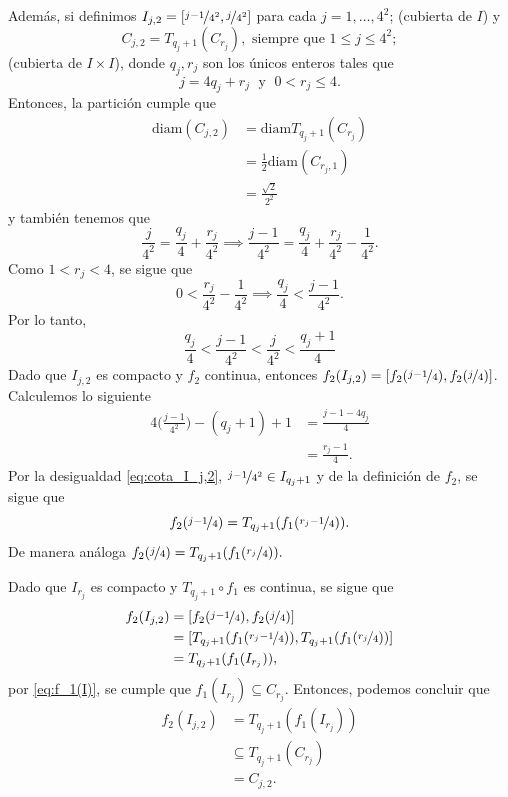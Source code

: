 Además, si definimos $I_{j,2}=[\nicefrac{j-1}{4^2},\nicefrac{j}{4^2}]$ para cada $j=1,\ldots,4^2$; (cubierta de $I$) y
\begin{equation*}
    C_{j,2}=T_{q_j+1}(C_{r_j}), \text{ siempre que } 1\leq j\leq 4^2;
\end{equation*}
(cubierta de $I\times I$), donde $q_j,r_j$ son los únicos enteros tales que
\[
j=4q_j+r_j\; \text{ y } \; 0<r_j\leq 4.
\]
Entonces, la partición cumple que
\begin{align*}
    \text{diam}(C_{j,2})&=\text{diam}T_{q_j+1}(C_{r_j})\\
    &=\frac{1}{2}\text{diam}(C_{r_j,1})\\
    &=\frac{\sqrt{2}}{2^2}
\end{align*}
y también tenemos que
\begin{equation*}
    \frac{j}{4^2}=\frac{q_j}{4}+\frac{r_j}{4^2}
\implies
    \frac{j-1}{4^2}=\frac{q_j}{4}+\frac{r_j}{4^2}-\frac{1}{4^2}.
\end{equation*}
Como $1<r_j<4$, se sigue que 
\begin{equation*}
    0<\frac{r_j}{4^2}-\frac{1}{4^2}\implies \frac{q_j}{4}<\frac{j-1}{4^2}.
\end{equation*}
Por lo tanto,
\begin{equation}
\label{eq:cota_I_j,2}
    \frac{q_j}{4}<\frac{j-1}{4^2}<\frac{j}{4^2}<\frac{q_j+1}{4}
\end{equation}
Dado que $I_{j,2}$ es compacto y $f_2$ continua, entonces $f_2(I_{j,2})=[f_2(\nicefrac{j-1}{4}),f_2(\nicefrac{j}{4})]$. Calculemos lo siguiente
\begin{align*}
    4\Big(\frac{j-1}{4^2}\Big)-(q_j+1)+1&=\frac{j-1-4q_j}{4}\\
    &=\frac{r_j-1}{4}.
\end{align*}
 Por la desigualdad \ref{eq:cota_I_j,2}, $\nicefrac{j-1}{4^2}\in I_{q_j+1}$ y de la definición de $f_2$, se sigue que
\begin{equation*}
    f_2(\nicefrac{j-1}{4})=T_{q_j+1}(f_1(\nicefrac{r_j-1}{4})).
\end{equation*}
De manera análoga $f_2(\nicefrac{j}{4})=T_{q_j+1}(f_1(\nicefrac{r_j\hspace{0.25mm}}{4})).$

Dado que $I_{r_j}$ es compacto y $T_{q_j+1}\circ f_1$ es continua, se sigue que
\begin{align*}
    f_2(I_{j,2})&=
    [f_2(\nicefrac{j-1}{4}),f_2(\nicefrac{j}{4})]\\
    &=[T_{q_j+1}(f_1(\nicefrac{r_j-1}{4})),T_{q_j+1}(f_1(\nicefrac{r_j}{4}))]\\
    &=T_{q_j+1}(f_1(I_{r_j})),
\end{align*}
por \ref{eq:f_1(I)}, se cumple que $f_1(I_{r_j})\subseteq C_{r_j}$. Entonces, podemos concluir que
\begin{align*}
    f_2(I_{j,2})&=T_{q_j+1}(f_1(I_{r_j}))\\
    &\subseteq T_{q_j+1}(C_{r_j})\\
    &=C_{j,2}.
\end{align*}

